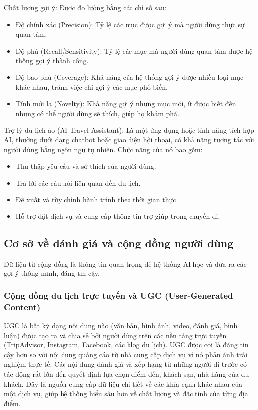 Chất lượng gợi ý: Được đo lường bằng các chỉ số sau:
\begin{itemize}
    \item Độ chính xác (Precision): Tỷ lệ các mục được gợi ý mà người dùng thực sự quan tâm.
    \item Độ phủ (Recall/Sensitivity): Tỷ lệ các mục mà người dùng quan tâm được hệ thống gợi ý thành công.
    \item Độ bao phủ (Coverage): Khả năng của hệ thống gợi ý được nhiều loại mục khác nhau, tránh việc chỉ gợi ý các mục phổ biến.
    \item Tính mới lạ (Novelty): Khả năng gợi ý những mục mới, ít được biết đến nhưng có thể người dùng sẽ thích, giúp họ khám phá.
\end{itemize}

Trợ lý du lịch ảo (AI Travel Assistant): Là một ứng dụng hoặc tính năng tích hợp AI, thường dưới dạng chatbot hoặc giao diện hội thoại, có khả năng tương tác với người dùng bằng ngôn ngữ tự nhiên. Chức năng của nó bao gồm:
\begin{itemize}
    \item Thu thập yêu cầu và sở thích của người dùng.
    \item Trả lời các câu hỏi liên quan đến du lịch.
    \item Đề xuất và tùy chỉnh hành trình theo thời gian thực.
    \item Hỗ trợ đặt dịch vụ và cung cấp thông tin trợ giúp trong chuyến đi.
\end{itemize}

\subsection{Cơ sở về đánh giá và cộng đồng người dùng}
Dữ liệu từ cộng đồng là thông tin quan trọng để hệ thống AI học và đưa ra các gợi ý thông minh, đáng tin cậy.

\subsubsection{Cộng đồng du lịch trực tuyến và UGC (User-Generated Content)}
UGC là bất kỳ dạng nội dung nào (văn bản, hình ảnh, video, đánh giá, bình luận) được tạo ra và chia sẻ bởi người dùng trên các nền tảng trực tuyến (TripAdvisor, Instagram, Facebook, các blog du lịch). UGC được coi là đáng tin cậy hơn so với nội dung quảng cáo từ nhà cung cấp dịch vụ vì nó phản ánh trải nghiệm thực tế. Các nội dung đánh giá và xếp hạng từ những người đi trước có tác động rất lớn đến quyết định lựa chọn điểm đến, khách sạn, nhà hàng của du khách. Đây là nguồn cung cấp dữ liệu chi tiết về các khía cạnh khác nhau của một dịch vụ, giúp hệ thống hiểu sâu hơn về chất lượng và đặc tính của từng địa điểm.


